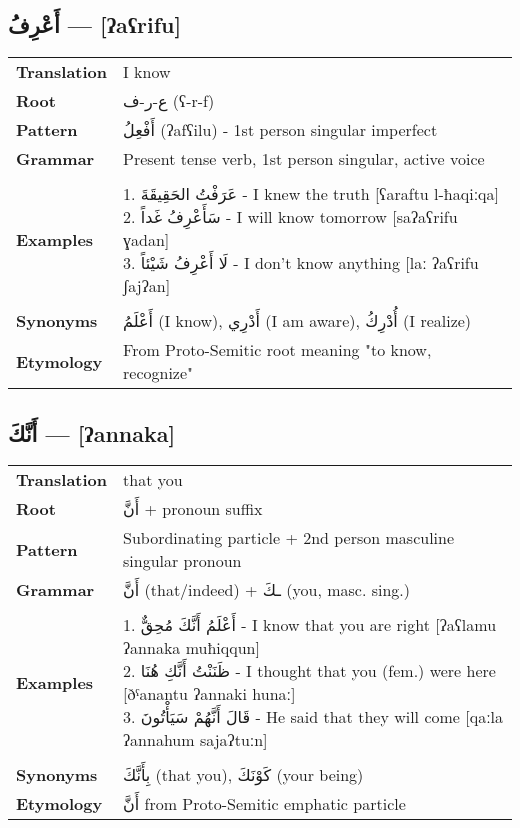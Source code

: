 \documentclass[letterpaper,12pt]{article}
\begin{document}
\subsection{\textarabic{أَعْرِفُ} — [ʔaʕrifu]}

\begin{tabular}{p{3cm}p{10cm}}
\toprule
\textbf{Translation} & I know \\
\textbf{Root} & \textarabic{ع-ر-ف} (ʕ-r-f) \\
\textbf{Pattern} & \textarabic{أَفْعِلُ} (ʔafʕilu) - 1st person singular imperfect \\
\textbf{Grammar} & Present tense verb, 1st person singular, active voice \\
\midrule \\
\textbf{Examples} & \makecell[l]{\parbox{9.5cm}{
1. \textarabic{عَرَفْتُ الحَقِيقَةَ} - I knew the truth [ʕaraftu l-ħaqiːqa]\\
2. \textarabic{سَأَعْرِفُ غَداً} - I will know tomorrow [saʔaʕrifu ɣadan]\\
3. \textarabic{لَا أَعْرِفُ شَيْئاً} - I don't know anything [laː ʔaʕrifu ʃajʔan]
}} \\
\midrule \\
\textbf{Synonyms} & \textarabic{أَعْلَمُ} (I know), \textarabic{أَدْرِي} (I am aware), \textarabic{أُدْرِكُ} (I realize) \\
\textbf{Etymology} & From Proto-Semitic root meaning "to know, recognize" \\
\bottomrule
\end{tabular}

\subsection{\textarabic{أَنَّكَ} — [ʔannaka]}

\begin{tabular}{p{3cm}p{10cm}}
\toprule
\textbf{Translation} & that you \\
\textbf{Root} & \textarabic{أَنَّ} + pronoun suffix \\
\textbf{Pattern} & Subordinating particle + 2nd person masculine singular pronoun \\
\textbf{Grammar} & \textarabic{أَنَّ} (that/indeed) + \textarabic{ـكَ} (you, masc. sing.) \\
\midrule \\
\textbf{Examples} & \makecell[l]{\parbox{9.5cm}{
1. \textarabic{أَعْلَمُ أَنَّكَ مُحِقٌّ} - I know that you are right [ʔaʕlamu ʔannaka muħiqqun]\\
2. \textarabic{ظَنَنْتُ أَنَّكِ هُنَا} - I thought that you (fem.) were here [ðˤanantu ʔannaki hunaː]\\
3. \textarabic{قَالَ أَنَّهُمْ سَيَأْتُونَ} - He said that they will come [qaːla ʔannahum sajaʔtuːn]
}} \\
\midrule \\
\textbf{Synonyms} & \textarabic{بِأَنَّكَ} (that you), \textarabic{كَوْنَكَ} (your being) \\
\textbf{Etymology} & \textarabic{أَنَّ} from Proto-Semitic emphatic particle \\
\bottomrule
\end{tabular}
\end{document}
